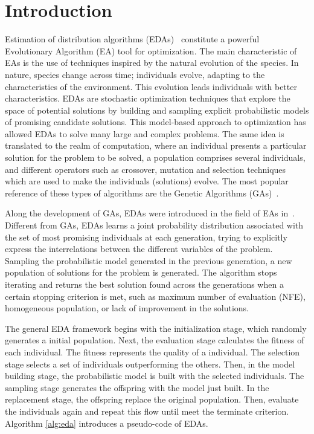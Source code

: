 \section{Introduction}
\label{ch:introduction}

Estimation of distribution algorithms (EDAs)~\citep{lozano2006towards, larranaga2002estimation, pelikan2002survey, Hauschild2011} constitute a powerful Evolutionary Algorithm (EA) tool for optimization. The main characteristic of EAs is the use of techniques inspired by the natural evolution of the species. In nature, species change across time; individuals evolve, adapting to the characteristics of the environment. This evolution leads individuals with better characteristics. EDAs are stochastic optimization techniques that explore the space of potential solutions by building and sampling explicit probabilistic models of promising candidate solutions. This model-based approach to optimization has allowed EDAs to solve many large and complex problems. The same idea is translated to the realm of computation, where an individual presents a particular solution for the problem to be solved, a population comprises several individuals, and different operators such as crossover, mutation and selection techniques which are used to make the individuals (solutions) evolve. The most popular reference of these types of algorithms are the Genetic Algorithms (GAs)~\citep{Goldberg:1989:GAS:534133}.

Along the development of GAs, EDAs were introduced in the field of EAs in~\citep{muhlenbein1996recombination}. Different from GAs, EDAs learns a joint probability distribution associated with the set of most promising individuals at each generation, trying to explicitly express the interrelations between the different variables of the problem. Sampling the probabilistic model generated in the previous generation, a new population of solutions for the problem is generated. The algorithm stops iterating and returns the best solution found across the generations when a certain stopping criterion is met, such as maximum number of evaluation (NFE), homogeneous population, or lack of improvement in the solutions.

The general EDA framework begins with the initialization stage, which randomly generates a initial population. Next, the evaluation stage calculates the fitness of each individual. The fitness represents the quality of a individual. The selection stage selects a set of individuals outperforming the others. Then, in the model building stage, the probabilistic model is built with the selected individuals. The sampling stage generates the offspring with the model just built. In the replacement stage, the offspring replace the original population. Then, evaluate the individuals again and repeat this flow until meet the terminate criterion. Algorithm \ref{alg:eda} introduces a pseudo-code of EDAs.

